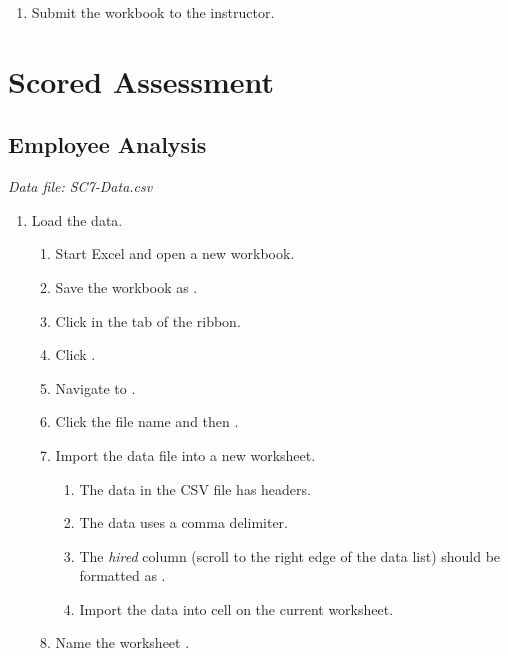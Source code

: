 \begin{enumerate}
	\item Submit the  workbook to the instructor.

\end{enumerate}

\section{Scored Assessment}

\subsection{Employee Analysis}

\textit{Data file: SC7-Data.csv}

\begin{enumerate}
	\item Load the data.
	
	\begin{enumerate}
		\item Start Excel and open a new workbook.
		\item Save the workbook as .
		\item Click  in the  tab of the ribbon.
		\item Click . 
		\item Navigate to .
		\item Click the file name and then .
		\item Import the data file into a new worksheet.
		
		\begin{enumerate}
			\item The data in the CSV file has headers.
			\item The data uses a comma delimiter.
			\item The \textit{hired} column (scroll to the right edge of the data list) should be formatted as .
			\item Import the data into cell  on the current worksheet.
		\end{enumerate}
		
		\item Name the worksheet .
		
	\end{enumerate}
	

\end{enumerate}

